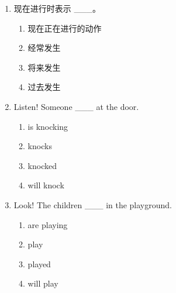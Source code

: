 \documentclass[11pt,a4paper]{ctexart}
\begin{document}
\begin{enumerate}[leftmargin=*,itemsep=4pt]
\begin{enumerate}[label=\Alph*.,leftmargin=2em,itemsep=1pt,topsep=2pt]
\end{enumerate}
\item 现在进行时表示 \_\_\_。
\begin{enumerate}[label=\Alph*.,leftmargin=2em,itemsep=1pt,topsep=2pt]
\item 现在正在进行的动作
\item 经常发生
\item 将来发生
\item 过去发生
\end{enumerate}
\item Listen! Someone \_\_\_ at the door.
\begin{enumerate}[label=\Alph*.,leftmargin=2em,itemsep=1pt,topsep=2pt]
\item is knocking
\item knocks
\item knocked
\item will knock
\end{enumerate}
\item Look! The children \_\_\_ in the playground.
\begin{enumerate}[label=\Alph*.,leftmargin=2em,itemsep=1pt,topsep=2pt]
\item are playing
\item play
\item played
\item will play
\end{enumerate}
\end{enumerate}
\end{document}
